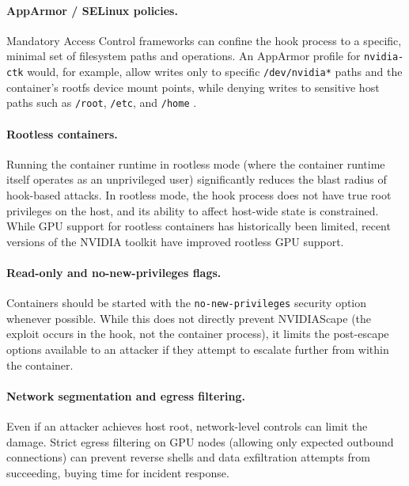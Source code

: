 \paragraph{AppArmor / SELinux policies.} Mandatory Access Control frameworks can confine the hook process to a specific, minimal set of filesystem paths and operations. An AppArmor profile for \texttt{nvidia-ctk} would, for example, allow writes only to specific \texttt{/dev/nvidia*} paths and the container's rootfs device mount points, while denying writes to sensitive host paths such as \texttt{/root}, \texttt{/etc}, and \texttt{/home} \cite{apparmor_ubuntu}.
 
\paragraph{Rootless containers.} Running the container runtime in rootless mode (where the container runtime itself operates as an unprivileged user) significantly reduces the blast radius of hook-based attacks. In rootless mode, the hook process does not have true root privileges on the host, and its ability to affect host-wide state is constrained. While GPU support for rootless containers has historically been limited, recent versions of the NVIDIA toolkit have improved rootless GPU support.
 
\paragraph{Read-only and no-new-privileges flags.} Containers should be started with the \texttt{no-new-privileges} security option whenever possible. While this does not directly prevent NVIDIAScape (the exploit occurs in the hook, not the container process), it limits the post-escape options available to an attacker if they attempt to escalate further from within the container.
 
\paragraph{Network segmentation and egress filtering.} Even if an attacker achieves host root, network-level controls can limit the damage. Strict egress filtering on GPU nodes (allowing only expected outbound connections) can prevent reverse shells and data exfiltration attempts from succeeding, buying time for incident response.
